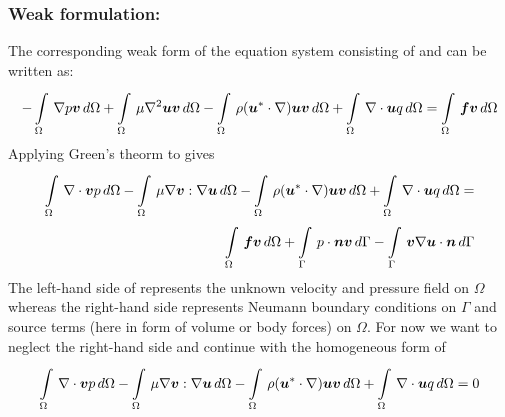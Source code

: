 \subsubsection{Weak formulation:}

The corresponding weak form of the equation system consisting of  and  can be written as:
\begin{equation}
  -\gint{\Omega}{}{\gradient{}{p}\vectr{v}}{\Omega}
  +\gint{\Omega}{}{\mu\laplacian{\vectr{u}}\vectr{v}}{\Omega}
  -\gint{\Omega}{}{\rho(\vectr{u}^*\cdot\grad)\vectr{u}\vectr{v} }{\Omega}
  +\gint{\Omega}{}{\grad\cdot \vectr{u}q}{\Omega}=
  \gint{\Omega}{}{\vectr{f}\vectr{v}}{\Omega}  
  \label{eqn:Stokesweakform}
\end{equation}
Applying Green's theorm to  gives
\begin{equation}
  \begin{split}
    \displaystyle\int\limits_{\Omega}^{} \,\nabla\cdot\boldsymbol{v}p\,d\Omega 
  -  \displaystyle\int\limits_{\Omega}^{} \,\mu\nabla\boldsymbol{v}:\nabla\boldsymbol{u}\,d\Omega 
  -  \displaystyle\int\limits_{\Omega}^{} \,\rho(\boldsymbol{u}^*\cdot\nabla)\boldsymbol{u}\boldsymbol{v}\,d\Omega 
  +  \displaystyle\int\limits_{\Omega}^{} \,\nabla\cdot \boldsymbol{u}q\,d\Omega =\\
    \displaystyle\int\limits_{\Omega}^{} \,\boldsymbol{f}\boldsymbol{v}\,d\Omega   
  +  \displaystyle\int\limits_{\Gamma}^{} \,p\cdot\boldsymbol{n}\boldsymbol{v}\,d\Gamma 
  -  \displaystyle\int\limits_{\Gamma}^{} \,\boldsymbol{v}\nabla\boldsymbol{u}\cdot\boldsymbol{n}\,d\Gamma 
  \end{split}
  \label{eqn:Stokesweakform2}
\end{equation}
The left-hand side of  represents the unknown velocity and pressure field on $\Omega$ whereas the right-hand side represents Neumann boundary conditions on $\Gamma$ and source terms (here in form of volume or body forces) on $\Omega$. For now we want to neglect the right-hand side and continue with the homogeneous form of 
\begin{equation}
  \begin{split}
    \displaystyle\int\limits_{\Omega}^{} \,\nabla\cdot\boldsymbol{v}p\,d\Omega 
  -  \displaystyle\int\limits_{\Omega}^{} \,\mu\nabla\boldsymbol{v}:\nabla\boldsymbol{u}\,d\Omega 
  -  \displaystyle\int\limits_{\Omega}^{} \,\rho(\boldsymbol{u}^*\cdot\nabla)\boldsymbol{u}\boldsymbol{v}\,d\Omega 
  +  \displaystyle\int\limits_{\Omega}^{} \,\nabla\cdot \boldsymbol{u}q\,d\Omega =0
  \end{split}
  \label{eqn:Stokesweakform3}
\end{equation}

